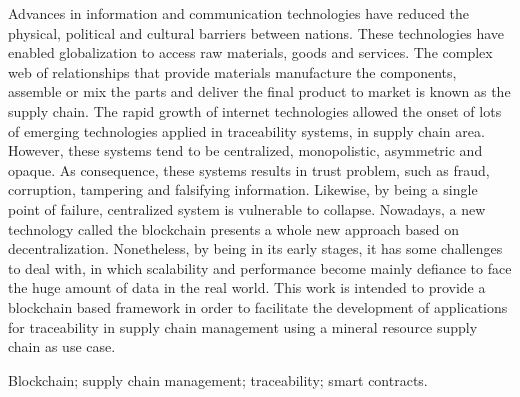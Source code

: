 \abstract
Advances in information and communication technologies have reduced the physical, political and cultural barriers between nations. These technologies have enabled globalization to access raw materials, goods and services. The complex web of relationships that provide materials manufacture the components, assemble or mix the parts and deliver the final product to market is known as the supply chain. The rapid growth of internet technologies allowed the onset of  lots of emerging technologies applied in traceability systems, in supply chain area. However, these systems tend to be centralized, monopolistic, asymmetric and opaque. As consequence, these systems results in trust problem, such as fraud, corruption, tampering and falsifying information. Likewise, by being a single point of failure, centralized system is vulnerable to collapse. Nowadays, a new technology called the blockchain presents a whole new approach based on decentralization. Nonetheless, by being in its early stages, it has some challenges to deal with, in which scalability and performance become  mainly  defiance to face the huge amount of data in the real world. This work is intended to provide a blockchain based framework in order to facilitate the development of applications for traceability in supply chain management using a mineral resource supply chain as use case.

\begin{keywords}
Blockchain; supply chain management; traceability; smart contracts.
\end{keywords}
